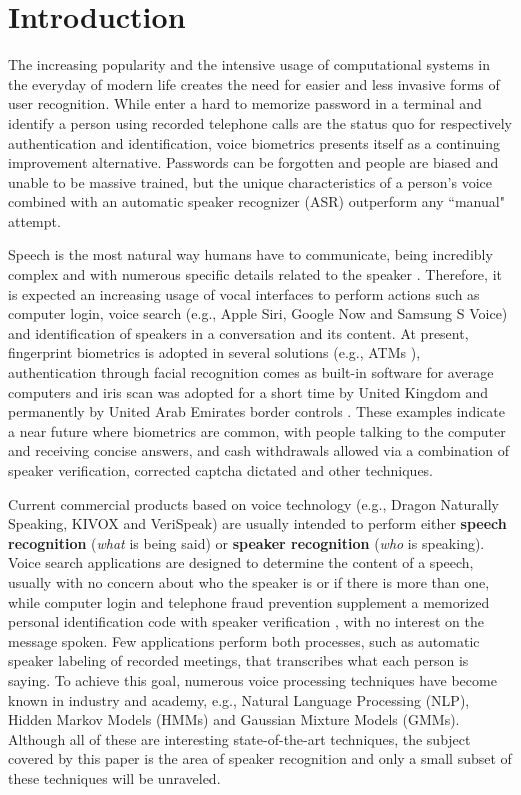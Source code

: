 \chapter{Introduction}
\label{ch:intro}

The increasing popularity and the intensive usage of computational systems in the everyday of modern life creates the need for easier and less invasive forms of user recognition. While enter a hard to memorize password in a terminal and identify a person using recorded telephone calls are the status quo for respectively authentication and identification, voice biometrics presents itself as a continuing improvement alternative. Passwords can be forgotten and people are biased and unable to be massive trained, but the unique characteristics of a person's voice combined with an automatic speaker recognizer (ASR) outperform any ``manual" attempt.

Speech is the most natural way humans have to communicate, being incredibly complex and with numerous specific details related to the speaker . Therefore, it is expected an increasing usage of vocal interfaces to perform actions such as computer login, voice search (e.g., Apple Siri, Google Now and Samsung S Voice) and identification of speakers in a conversation and its content. At present, fingerprint biometrics is adopted in several solutions (e.g., ATMs ), authentication through facial recognition comes as built-in software for average computers and iris scan was adopted for a short time by United Kingdom and permanently by United Arab Emirates border controls . These examples indicate a near future where biometrics are common, with people talking to the computer and receiving concise answers, and cash withdrawals allowed via a combination of speaker verification, corrected captcha dictated and other techniques.

Current commercial products based on voice technology (e.g., Dragon Naturally Speaking, KIVOX and VeriSpeak) are usually intended to perform either \textbf{speech recognition} (\emph{what} is being said) or \textbf{speaker recognition} (\emph{who} is speaking). Voice search applications are designed to determine the content of a speech, usually with no concern about who the speaker is or if there is more than one, while computer login and telephone fraud prevention supplement a memorized personal identification code with speaker verification , with no interest on the message spoken. Few applications perform both processes, such as automatic speaker labeling of recorded meetings, that transcribes what each person is saying. To achieve this goal, numerous voice processing techniques have become known in industry and academy, e.g., Natural Language Processing (NLP), Hidden Markov Models (HMMs) and Gaussian Mixture Models (GMMs). Although all of these are interesting state-of-the-art techniques, the subject covered by this paper is the area of speaker recognition and only a small subset of these techniques will be unraveled.


